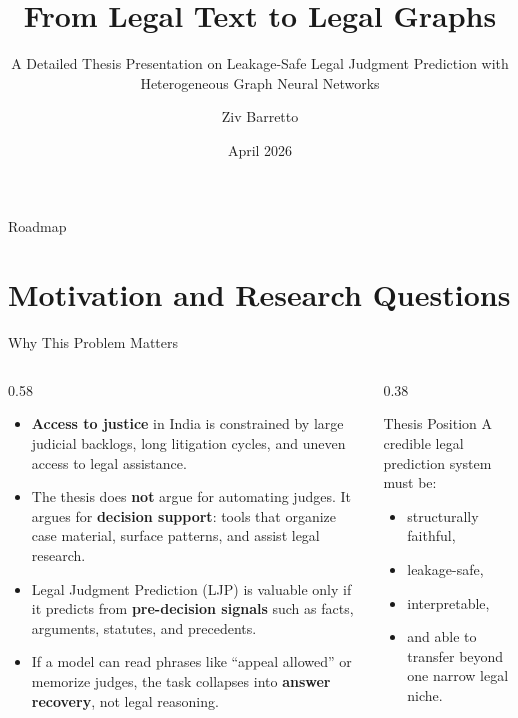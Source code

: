 \documentclass[aspectratio=169,11pt]{beamer}
\title{From Legal Text to Legal Graphs}
\subtitle{A Detailed Thesis Presentation on Leakage-Safe Legal Judgment Prediction with Heterogeneous Graph Neural Networks}
\author{Ziv Barretto}
\institute{Thesis Presentation}
\date{April 2026}
\newenvironment{tightitemize}{
  \begin{itemize}
    \setlength{\itemsep}{2pt}
    \setlength{\parskip}{0pt}
}{\end{itemize}}
\newcommand{\highlight}[1]{\textcolor{ThesisBlue}{\textbf{#1}}}
\begin{document}
\begin{frame}[plain]
  \titlepage
\end{frame}

\begin{frame}{Roadmap}
  \tableofcontents
\end{frame}

\section{Motivation and Research Questions}

\begin{frame}{Why This Problem Matters}
  \begin{columns}[T]
    \begin{column}{0.58\textwidth}
      \begin{tightitemize}
        \item \highlight{Access to justice} in India is constrained by large judicial backlogs, long litigation cycles, and uneven access to legal assistance.
        \item The thesis does \highlight{not} argue for automating judges. It argues for \highlight{decision support}: tools that organize case material, surface patterns, and assist legal research.
        \item Legal Judgment Prediction (LJP) is valuable only if it predicts from \highlight{pre-decision signals} such as facts, arguments, statutes, and precedents.
        \item If a model can read phrases like ``appeal allowed'' or memorize judges, the task collapses into \highlight{answer recovery}, not legal reasoning.
      \end{tightitemize}
    \end{column}
    \begin{column}{0.38\textwidth}
      \begin{block}{Thesis Position}
        A credible legal prediction system must be:
        \begin{tightitemize}
          \item structurally faithful,
          \item leakage-safe,
          \item interpretable,
          \item and able to transfer beyond one narrow legal niche.
        \end{tightitemize}
      \end{block}
    \end{column}
  \end{columns}
\end{frame}
\end{document}
